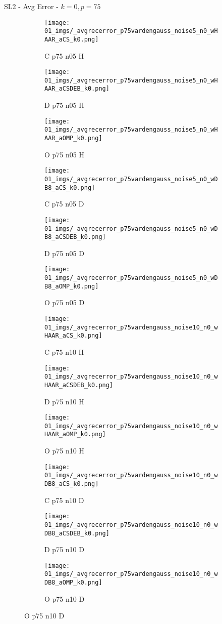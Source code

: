 \begin{frame}{SL2 - Avg Error - $k=0,p=75$}{}
\begin{figure}
\begin{subfigure}{0.13\textwidth}
\texttt{[image: 01\_imgs/\_avgrecerror\_p75vardengauss\_noise5\_n0\_wHAAR\_aCS\_k0.png]}
\caption*{\tiny C p75 n05 H}
\end{subfigure}
\begin{subfigure}{0.13\textwidth}
\texttt{[image: 01\_imgs/\_avgrecerror\_p75vardengauss\_noise5\_n0\_wHAAR\_aCSDEB\_k0.png]}
\caption*{\tiny D p75 n05 H}
\end{subfigure}
\begin{subfigure}{0.13\textwidth}
\texttt{[image: 01\_imgs/\_avgrecerror\_p75vardengauss\_noise5\_n0\_wHAAR\_aOMP\_k0.png]}
\caption*{\tiny O p75 n05 H}
\end{subfigure}
\begin{subfigure}{0.13\textwidth}
\texttt{[image: 01\_imgs/\_avgrecerror\_p75vardengauss\_noise5\_n0\_wDB8\_aCS\_k0.png]}
\caption*{\tiny C p75 n05 D}
\end{subfigure}
\begin{subfigure}{0.13\textwidth}
\texttt{[image: 01\_imgs/\_avgrecerror\_p75vardengauss\_noise5\_n0\_wDB8\_aCSDEB\_k0.png]}
\caption*{\tiny D p75 n05 D}
\end{subfigure}
\begin{subfigure}{0.13\textwidth}
\texttt{[image: 01\_imgs/\_avgrecerror\_p75vardengauss\_noise5\_n0\_wDB8\_aOMP\_k0.png]}
\caption*{\tiny O p75 n05 D}
\end{subfigure}

\vspace{5pt}

\begin{subfigure}{0.13\textwidth}
\texttt{[image: 01\_imgs/\_avgrecerror\_p75vardengauss\_noise10\_n0\_wHAAR\_aCS\_k0.png]}
\caption*{\tiny C p75 n10 H}
\end{subfigure}
\begin{subfigure}{0.13\textwidth}
\texttt{[image: 01\_imgs/\_avgrecerror\_p75vardengauss\_noise10\_n0\_wHAAR\_aCSDEB\_k0.png]}
\caption*{\tiny D p75 n10 H}
\end{subfigure}
\begin{subfigure}{0.13\textwidth}
\texttt{[image: 01\_imgs/\_avgrecerror\_p75vardengauss\_noise10\_n0\_wHAAR\_aOMP\_k0.png]}
\caption*{\tiny O p75 n10 H}
\end{subfigure}
\begin{subfigure}{0.13\textwidth}
\texttt{[image: 01\_imgs/\_avgrecerror\_p75vardengauss\_noise10\_n0\_wDB8\_aCS\_k0.png]}
\caption*{\tiny C p75 n10 D}
\end{subfigure}
\begin{subfigure}{0.13\textwidth}
\texttt{[image: 01\_imgs/\_avgrecerror\_p75vardengauss\_noise10\_n0\_wDB8\_aCSDEB\_k0.png]}
\caption*{\tiny D p75 n10 D}
\end{subfigure}
\begin{subfigure}{0.13\textwidth}
\texttt{[image: 01\_imgs/\_avgrecerror\_p75vardengauss\_noise10\_n0\_wDB8\_aOMP\_k0.png]}
\caption*{\tiny O p75 n10 D}
\end{subfigure}


\end{figure}
\end{frame}
